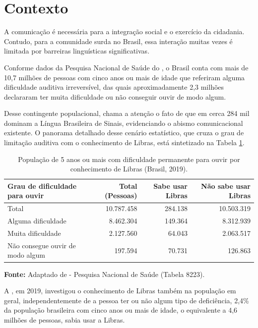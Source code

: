 \documentclass[
    12pt,                %
    openright,           %
    oneside,             %
    a4paper,             %
    english,             %
    brazil               %
]{abntex2}
\begin{document}
\section{Contexto}
\label{sec:contexto}

A comunicação é necessária para a integração social e o exercício da cidadania. Contudo, para a comunidade surda no Brasil, essa interação muitas vezes é limitada por barreiras linguísticas significativas.

Conforme dados da Pesquisa Nacional de Saúde do , o Brasil conta com mais de 10,7 milhões de pessoas com cinco anos ou mais de idade que referiram alguma dificuldade auditiva irreversível, das quais aproximadamente 2,3 milhões declararam ter muita dificuldade ou não conseguir ouvir de modo algum.

Desse contingente populacional, chama a atenção o fato de que em cerca 284 mil dominam a Língua Brasileira de Sinais, evidenciando o abismo comunicacional existente. O panorama detalhado desse cenário estatístico, que cruza o grau de limitação auditiva com o conhecimento de Libras, está sintetizado na Tabela \ref{tab:ibge_libras}.

\begin{table}[htbp]
\centering
\caption{População de 5 anos ou mais com dificuldade permanente para ouvir por conhecimento de Libras (Brasil, 2019).}
\label{tab:ibge_libras}
\small
\begin{tabularx}{\textwidth}{Xrrr}
\hline
\textbf{Grau de dificuldade para ouvir} & \textbf{Total (Pessoas)} & \textbf{Sabe usar Libras} & \textbf{Não sabe usar Libras} \\ \hline
Total & 10.787.458 & 284.138 & 10.503.319 \\
Alguma dificuldade & 8.462.304 & 149.364 & 8.312.939 \\
Muita dificuldade & 2.127.560 & 64.043 & 2.063.517 \\
Não consegue ouvir de modo algum & 197.594 & 70.731 & 126.863 \\ \hline
\end{tabularx}
\noindent\footnotesize{\newline \textbf{Fonte:} Adaptado de  - Pesquisa Nacional de Saúde (Tabela 8223).}
\end{table}

A , em 2019, investigou o conhecimento de Libras também na população em geral, independentemente de a pessoa ter ou não algum tipo de deficiência, 2,4\% da população brasileira com cinco anos ou mais de idade, o equivalente a 4,6 milhões de pessoas, sabia usar a Libras.
\end{document}
